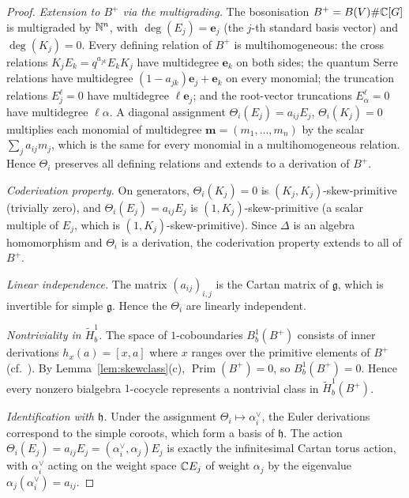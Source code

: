 \begin{proof}
\emph{Extension to $B^+$ via the multigrading.} The bosonisation $B^+ = B(V) \# \mathbb{C}[G]$ is multigraded by $\mathbb{N}^n$, with $\deg(E_j) = \mathbf{e}_j$ (the $j$-th standard basis vector) and $\deg(K_j) = 0$. Every defining relation of $B^+$ is multihomogeneous: the cross relations $K_j E_k = q^{a_{jk}} E_k K_j$ have multidegree $\mathbf{e}_k$ on both sides; the quantum Serre relations have multidegree $(1 - a_{jk}) \mathbf{e}_j + \mathbf{e}_k$ on every monomial; the truncation relations $E_j^\ell = 0$ have multidegree $\ell \mathbf{e}_j$; and the root-vector truncations $E_\alpha^\ell = 0$ have multidegree $\ell \alpha$. A diagonal assignment $\Theta_i(E_j) = a_{ij} E_j$, $\Theta_i(K_j) = 0$ multiplies each monomial of multidegree $\mathbf{m} = (m_1, \ldots, m_n)$ by the scalar $\sum_j a_{ij} m_j$, which is the same for every monomial in a multihomogeneous relation. Hence $\Theta_i$ preserves all defining relations and extends to a derivation of $B^+$.

\emph{Coderivation property.} On generators, $\Theta_i(K_j) = 0$ is $(K_j, K_j)$-skew-primitive (trivially zero), and $\Theta_i(E_j) = a_{ij} E_j$ is $(1, K_j)$-skew-primitive (a scalar multiple of $E_j$, which is $(1, K_j)$-skew-primitive). Since $\Delta$ is an algebra homomorphism and $\Theta_i$ is a derivation, the coderivation property extends to all of $B^+$.

\emph{Linear independence.} The matrix $(a_{ij})_{i,j}$ is the Cartan matrix of $\mathfrak{g}$, which is invertible for simple $\mathfrak{g}$. Hence the $\Theta_i$ are linearly independent.

\emph{Nontriviality in $\tilde{H}^1_b$.} The space of $1$-coboundaries $B^1_b(B^+)$ consists of inner derivations $h_x(a) = [x, a]$ where $x$ ranges over the primitive elements of $B^+$ (cf.~\cite[\S 2.1]{MW08}). By Lemma~\ref{lem:skewclass}(c), $\operatorname{Prim}(B^+) = 0$, so $B^1_b(B^+) = 0$. Hence every nonzero bialgebra $1$-cocycle represents a nontrivial class in $\tilde{H}^1_b(B^+)$.

\emph{Identification with $\mathfrak{h}$.} Under the assignment $\Theta_i \mapsto \alpha_i^\vee$, the Euler derivations correspond to the simple coroots, which form a basis of $\mathfrak{h}$. The action $\Theta_i(E_j) = a_{ij} E_j = (\alpha_i^\vee, \alpha_j) E_j$ is exactly the infinitesimal Cartan torus action, with $\alpha_i^\vee$ acting on the weight space $\mathbb{C} E_j$ of weight $\alpha_j$ by the eigenvalue $\alpha_j(\alpha_i^\vee) = a_{ij}$.
\end{proof}

